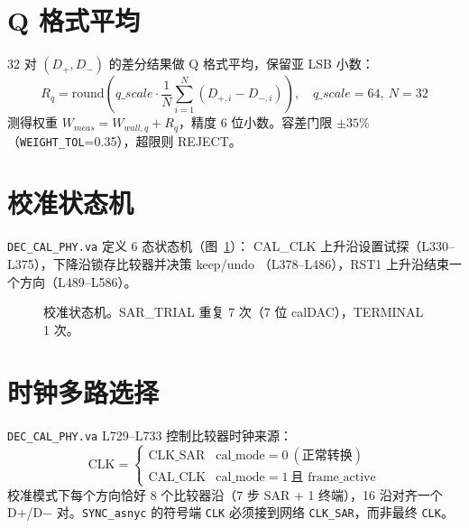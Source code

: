 \documentclass[UTF8,a4paper,11pt,twoside]{ctexrep}
\begin{document}
\section{Q 格式平均}

32 对 $(D_+,D_-)$ 的差分结果做 Q 格式平均，保留亚 LSB 小数：
\[
R_q = \mathrm{round}\!\left(q\_scale \cdot \frac{1}{N}\sum_{i=1}^{N}(D_{+,i}-D_{-,i})\right),\quad
q\_scale=64,\ N=32
\]
测得权重 $W_{meas} = W_{wall,q} + R_q$，精度 6 位小数。容差门限 $\pm 35\%$
（\texttt{WEIGHT\_TOL}=0.35），超限则 REJECT。

\section{校准状态机}

\texttt{DEC\_CAL\_PHY.va} 定义 6 态状态机（图~\ref{fig:fsm}）：
CAL\_CLK 上升沿设置试探（L330--L375），下降沿锁存比较器并决策 keep/undo
（L378--L486），RST1 上升沿结束一个方向（L489--L586）。

\begin{figure}[ht]\centering
{}
\caption{校准状态机。SAR\_TRIAL 重复 7 次（7 位 calDAC），TERMINAL 1 次。}
\label{fig:fsm}
\end{figure}

\section{时钟多路选择}

\texttt{DEC\_CAL\_PHY.va} L729--L733 控制比较器时钟来源：
\[
\text{CLK} = \begin{cases}
\text{CLK\_SAR} & \text{cal\_mode}=0\ (\text{正常转换})\\
\text{CAL\_CLK} & \text{cal\_mode}=1\ \text{且 frame\_active}
\end{cases}
\]
校准模式下每个方向恰好 8 个比较器沿（7 步 SAR + 1 终端），16 沿对齐一个
D+/D$-$ 对。\texttt{SYNC\_asnyc} 的符号端 \texttt{CLK} 必须接到网络
\texttt{CLK\_SAR}，而非最终 \texttt{CLK}。
\end{document}
